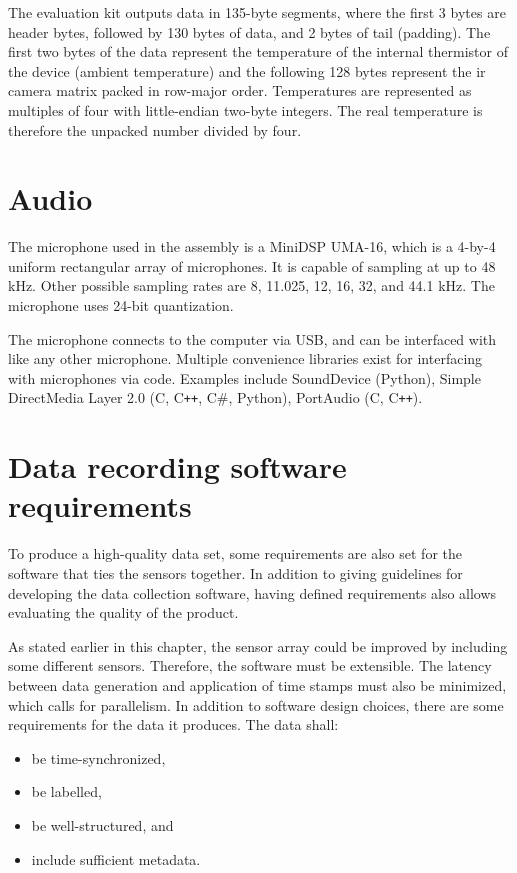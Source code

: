 The evaluation kit outputs data in 135-byte segments,
where the first 3 bytes are header bytes, followed by 130 bytes of data, and 2 bytes of tail (padding).
The first two bytes of the data represent the temperature 
of the internal thermistor of the device (ambient temperature)
and the following 128 bytes represent the \gls{ir} camera matrix packed in row-major order.
Temperatures are represented as multiples of four with little-endian two-byte integers. \cite{grid-eye-protocol}
The real temperature is therefore the unpacked number divided by four.

\section{Audio}
\label{sec:2-mic}
The microphone used in the assembly is a MiniDSP UMA-16,
which is a 4-by-4 uniform rectangular array of microphones.
It is capable of sampling at up to 48 kHz.
Other possible sampling rates are 8, 11.025, 12, 16, 32, and 44.1 kHz.
The microphone uses 24-bit quantization.

The microphone connects to the computer via USB,
and can be interfaced with like any other microphone.
Multiple convenience libraries exist for interfacing with microphones via code.
Examples include SoundDevice (Python)\cite{sounddevice-docs},
Simple DirectMedia Layer 2.0 (C, C\texttt{++}, C\#, Python)\cite{SDL2}, PortAudio (C, C\texttt{++})\cite{portaudio}.

\section{Data recording software requirements}
\label{sec:2-requirements}

To produce a high-quality data set,
some requirements are also set for the software that ties the sensors together.
In addition to giving guidelines for developing the data collection software,
having defined requirements also allows evaluating the quality of the product.

As stated earlier in this chapter,
the sensor array could be improved by including some different sensors.
Therefore, the software must be extensible.
The latency between data generation and application of time stamps must also be minimized,
which calls for parallelism.
In addition to software design choices, there are some requirements for the data it produces.
The data shall:
\begin{itemize}
    \item be time-synchronized,
    \item be labelled,
    \item be well-structured, and
    \item include sufficient metadata.
\end{itemize}

